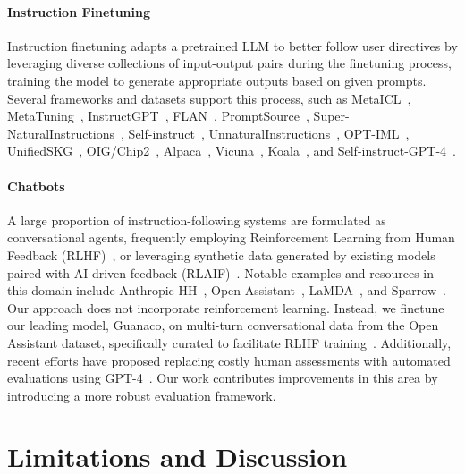 \paragraph{Instruction Finetuning} Instruction finetuning adapts a pretrained LLM to better follow user directives by leveraging diverse collections of input-output pairs during the finetuning process, training the model to generate appropriate outputs based on given prompts. Several frameworks and datasets support this process, such as MetaICL~\citep{min2021metaicl}, MetaTuning~\citep{zhong2021adapting}, InstructGPT~\citep{ouyang2022training}, FLAN~\citep{wei2021finetuned,chung2022scaling}, PromptSource~\citep{bach2022promptsource}, Super-NaturalInstructions~\citep{wang2022super,sanh2021multitask}, Self-instruct~\citep{wang2022self}, UnnaturalInstructions~\citep{honovich2022unnatural}, OPT-IML~\citep{iyer2022opt}, UnifiedSKG~\citep{xie2022unifiedskg}, OIG/Chip2~\citep{laion2023}, Alpaca~\citep{alpaca}, Vicuna~\citep{vicuna2023}, Koala~\citep{koala_blogpost_2023}, and Self-instruct-GPT-4~\citep{peng2023instruction}.

\paragraph{Chatbots} A large proportion of instruction-following systems are formulated as conversational agents, frequently employing Reinforcement Learning from Human Feedback (RLHF)~\citep{christiano2017deep}, or leveraging synthetic data generated by existing models paired with AI-driven feedback (RLAIF)~\citep{bai2022constitutional}. Notable examples and resources in this domain include Anthropic-HH~\citep{askell2021general,bai2022training}, Open Assistant~\citep{kopf2023openassistant}, LaMDA~\citep{thoppilan2022lamda}, and Sparrow~\citep{glaese2022improving}. Our approach does not incorporate reinforcement learning. Instead, we finetune our leading model, Guanaco, on multi-turn conversational data from the Open Assistant dataset, specifically curated to facilitate RLHF training~\citep{kopf2023openassistant}. Additionally, recent efforts have proposed replacing costly human assessments with automated evaluations using GPT-4~\citep{vicuna2023,peng2023instruction}. Our work contributes improvements in this area by introducing a more robust evaluation framework.

\section{Limitations and Discussion}

